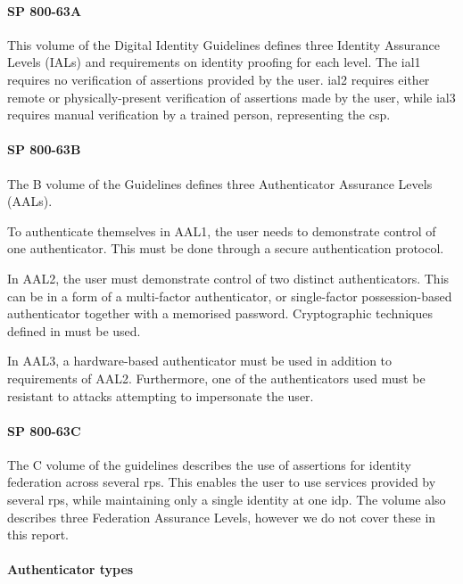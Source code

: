 \paragraph{SP 800-63A}
This volume of the Digital Identity Guidelines defines three Identity Assurance Levels (IALs) and requirements on identity proofing for each level. The \acrshort{ial}1 requires no verification of assertions provided by the user. \acrshort{ial}2 requires either remote or physically-present verification of assertions made by the user, while \acrshort{ial}3 requires manual verification by a trained person, representing the \acrshort{csp}.


\paragraph{SP 800-63B}
The B volume of the Guidelines defines three Authenticator Assurance Levels (AALs).

To authenticate themselves in AAL1, the user needs to demonstrate control of one authenticator. This must be done through a secure authentication protocol.

In AAL2, the user must demonstrate control of two distinct authenticators. This can be in a form of a multi-factor authenticator, or single-factor possession-based authenticator together with a memorised password. Cryptographic techniques defined in
must be used.

In AAL3, a hardware-based authenticator must be used in addition to requirements of AAL2. Furthermore, one of the authenticators used must be resistant to attacks attempting to impersonate the user.

\paragraph{SP 800-63C}
The C volume of the guidelines describes the use of assertions for identity federation across several \acrshort{rp}s. This enables the user to use services provided by several \acrshort{rp}s, while maintaining only a single identity at one \acrshort{idp}. The volume also describes three Federation Assurance Levels, however we do not cover these in this report.

\paragraph{Authenticator types}

